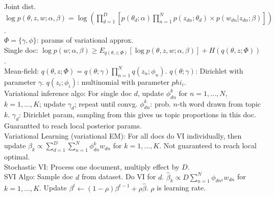 Joint dist. $\log p(\theta, z, w; \alpha, \beta) = \log ( \prod_{d=1}^D [ p(\theta_d; \alpha) \prod_{n=1}^N p(z_{dn}; \theta_d) \times p(w_{dn} | z_{dn}; \beta) ] )$.\\
$\Phi = \{\gamma, \phi\}$: params of variational approx.\\
Single doc: $\log p(w; \alpha, \beta) \geq E_{q(\theta, z; \Phi)}[\log p(\theta, z, w; \alpha, \beta)] + H(q(\theta, z; \Phi))$.\\
Mean-field: $q(\theta, z; \Phi) = q(\theta; \gamma)\prod_{n=1}^N q(z_n; \phi_n)$. $q(\theta; \gamma)$: Dirichlet with parameter $\gamma$. $q(z_i; \phi_i)$: multinomial with parameter $phi_i$.\\
Variational inference algo: For single doc $d$, update $\phi_{dn}^k$ for $n=1, \dots, N$, $k=1, \dots, K$; update $\gamma_d$; repeat until convg. $\phi_{dn}^k$: prob. $n$-th word drawn from topic $k$. $\gamma_d$: Dirichlet param, sampling from this gives us topic proportions in this doc. Guarantted to reach local posterior params.\\
Variational Learning (variational EM): For all docs do VI individually, then update $\beta_k \propto \sum_{d=1}^D \sum_{n=1}^N \phi_{dn}^k w_{dn}$ for $k=1, \dots, K$. Not guaranteed to reach local optimal.\\
Stochastic VI: Process one document, multiply effect by $D$.\\
SVI Algo: Sample doc $d$ from dataset. Do VI for $d$. $\hat{\beta}_k \propto D \sum_{n=1}^N \phi_{dn^k} w_{dn}$ for $k=1, \dots, K$. Update $\beta^t \leftarrow (1-\rho)\beta^{t-1} + \rho \hat{\beta}$. $\rho$ is learning rate.